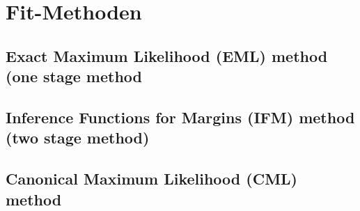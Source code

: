 
\section{Fit-Methoden}
\label{sec:fitmethoden}

\subsection{Exact Maximum Likelihood (EML) method (one stage method}
\label{sec:eml}

\subsection{Inference Functions for Margins (IFM) method (two stage method)}
\label{sec:ifm}

\subsection{Canonical Maximum Likelihood (CML) method}
\label{sec:cml}

